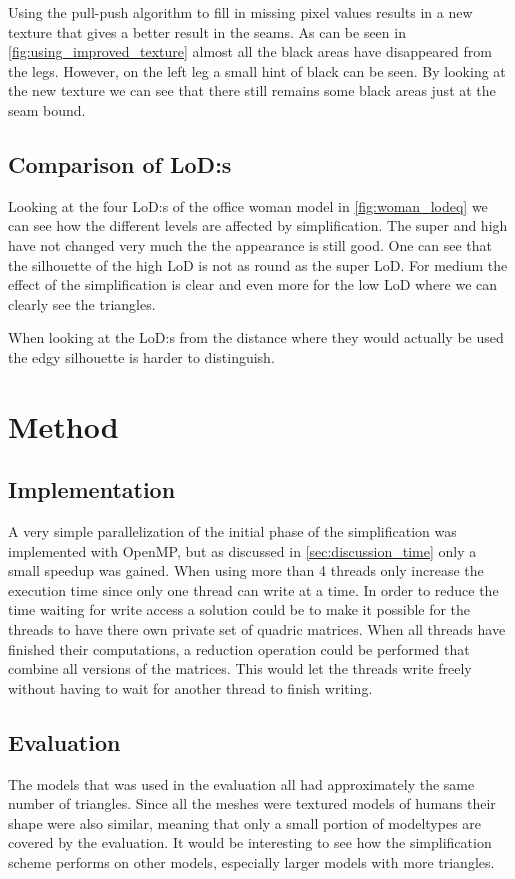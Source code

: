 Using the pull-push algorithm to fill in missing pixel values results in a new texture that gives a better result in the seams. As can be seen in \cref{fig:using_improved_texture} almost all the black areas have disappeared from the legs. However, on the left leg a small hint of black can be seen. By looking at the new texture we can see that there still remains some black areas just at the seam bound.


\subsection{Comparison of LoD:s} \label{sec:discussion_lod}
Looking at the four LoD:s of the office woman model in \cref{fig:woman_lodeq} we can see how the different levels are affected by simplification. The super and high have not changed very much the the appearance is still good. One can see that the silhouette of the high LoD is not as round as the super LoD. For medium the effect of the simplification is clear and even more for the low LoD where we can clearly see the triangles.

When looking at the LoD:s from the distance where they would actually be used the edgy silhouette is harder to distinguish. 

\clearpage

\section{Method} \label{sec:discussion_method}
\subsection{Implementation}
A very simple parallelization of the initial phase of the simplification was implemented with OpenMP, but as discussed in \cref{sec:discussion_time} only a small speedup was gained. When using more than 4 threads only increase the execution time since only one thread can write at a time. In order to reduce the time waiting for write access a solution could be to make it possible for the threads to have there own private set of quadric matrices. When all threads have finished their computations, a reduction operation could be performed that combine all versions of the matrices. This would let the threads write freely without having to wait for another thread to finish writing.

\subsection{Evaluation}
The models that was used in the evaluation all had approximately the same number of triangles. Since all the meshes were textured models of humans their shape were also similar, meaning that only a small portion of modeltypes are covered by the evaluation. It would be interesting to see how the simplification scheme performs on other models, especially larger models with more triangles.

